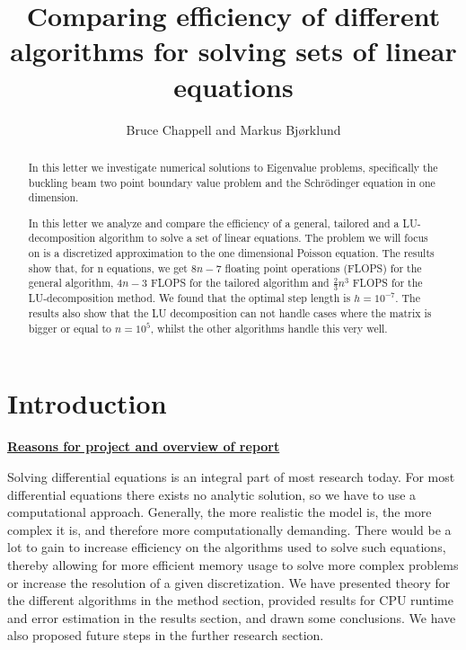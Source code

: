 \documentclass{emulateapj}
\begin{document}
\title{Comparing efficiency of different algorithms for solving sets of linear equations}

\author{Bruce Chappell and Markus Bjørklund}



\begin{abstract}
In this letter we investigate numerical solutions to Eigenvalue problems, specifically the buckling beam two point boundary value problem and the Schrödinger equation in one dimension.



In this letter we analyze and compare the efficiency of a general, tailored and a LU-decomposition algorithm to solve a set of linear equations. The problem we will focus on is a discretized approximation to the one dimensional Poisson equation. The results show that, for n equations, we get $8n-7$ floating point operations (FLOPS) for the general algorithm, $4n-3$ FLOPS for the tailored algorithm and $\frac{2}{3}n^3$ FLOPS for the LU-decomposition method. We found that the optimal step length is $h=10^{-7}$. The results also show that the LU decomposition can not handle cases where the matrix is bigger or equal to $n=10^5$, whilst the other algorithms handle this very well.

\end{abstract}

\section{Introduction}
\label{sec:introduction}
\underline{\textbf{Reasons for project and overview of report}}

Solving differential equations is an integral part of most research today. For most differential equations there exists no analytic solution, so we have to use a computational approach. Generally, the more realistic the model is, the more complex it is, and therefore more computationally demanding. There would be a lot to gain to increase efficiency on the algorithms used to solve such equations, thereby allowing for more efficient memory usage to solve more complex problems or increase the resolution of a given discretization. We have presented theory for the different algorithms in the method section, provided results for CPU runtime and error estimation in the results section, and drawn some conclusions. We have also proposed future steps in the further research section.
\end{document}
